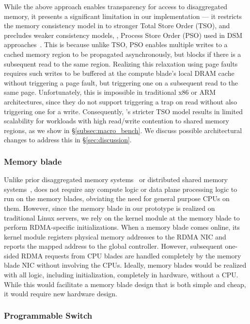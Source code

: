 While the above approach enables transparency for access to disaggregated memory, it presents a significant limitation in our implementation --- it restricts the memory consistency model in \mind to stronger Total Store Order (TSO), and precludes weaker consistency models, \eg, Process Store Order (PSO) used in DSM approaches~\cite{gam}. This is because unlike TSO, PSO enables multiple writes to a cached memory region to be propagated asynchronously, but blocks if there is a subsequent read to the same region. Realizing this relaxation using page faults requires such writes to be buffered at the compute blade's local DRAM cache without triggering a page fault, but triggering one on a subsequent read to the same page. Unfortunately, this is impossible in traditional x86 or ARM architectures, since they do not support triggering a trap on read without also triggering one for a write. Consequently, \mind's stricter TSO model results in limited scalability for workloads with high read/write contention to shared memory regions, as we show in \S\ref{subsec:macro_bench}. We discuss possible architectural changes to address this in \S\ref{sec:discussion}.

\subsubsection{Memory blade} 

Unlike prior disaggregated memory systems~\cite{legoos, infiniswap} or distributed shared memory systems~\cite{gam}, \mind does not require any compute logic or data plane processing logic to run on the memory blades, obviating the need for general purpose CPUs on them. However, since the memory blade in our prototype is realized on traditional Linux servers, we rely on the kernel module at the memory blade to perform RDMA-specific initializations. When a memory blade comes online, its kernel module registers physical memory addresses to the RDMA NIC and reports the mapped address to the global controller. However, subsequent one-sided RDMA requests from CPU blades are handled completely by the memory blade NIC without involving the CPUs. Ideally, memory blades would be realized with all logic, including initialization, completely in hardware, without a CPU. While this would facilitate a memory blade design that is both simple and cheap, it would require new hardware design.

\subsubsection{Programmable Switch}
\label{sssec:switchimpl}

